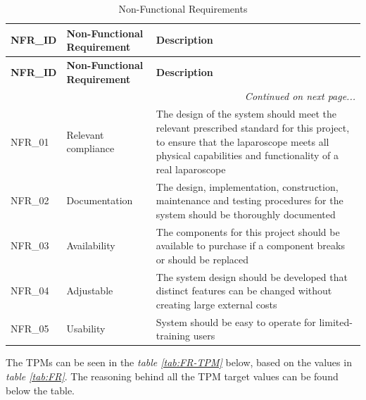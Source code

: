 \begin{longtable}{|p{}|p{}|p{}|}

\caption{Non-Functional Requirements}
\label{tab:NFR} \\

\hline
\textbf{NFR\_ID} & 
\textbf{Non-Functional Requirement} & 
\textbf{Description}       \\                    
\hline
\endfirsthead

\hline
\textbf{NFR\_ID} & 
\textbf{Non-Functional Requirement} & 
\textbf{Description} \\                         %
\hline
\endhead

\hline
\multicolumn{3}{r|}{\textit{Continued on next page...}} \\
\hline
\endfoot

\endlastfoot

NFR\_01 & 
Relevant \mbox{compliance} & 
The design of the system should meet the relevant 
prescribed standard for this project, to ensure that 
the laparoscope meets all physical capabilities and 
functionality of a real laparoscope     \\                            
\hline

NFR\_02 & 
Documentation & 
The design, implementation, construction, maintenance 
and testing procedures for the system should be 
thoroughly documented       \\                           
\hline

NFR\_03 & 
Availability & 
The components for this project should be available 
to purchase if a component breaks or should be 
replaced \\
\hline

NFR\_04 & 
Adjustable & 
The system design should be developed that distinct 
features can be changed without creating large 
external costs \\
\hline

NFR\_05 & 
Usability & 
System should be easy to operate for limited-training 
users \\
\hline

\end{longtable}

The TPMs can be seen in the \textit{table \ref{tab:FR-TPM}} below, based on the values in \textit{table \ref{tab:FR}}. The reasoning behind all the TPM target values can be found below the table.

